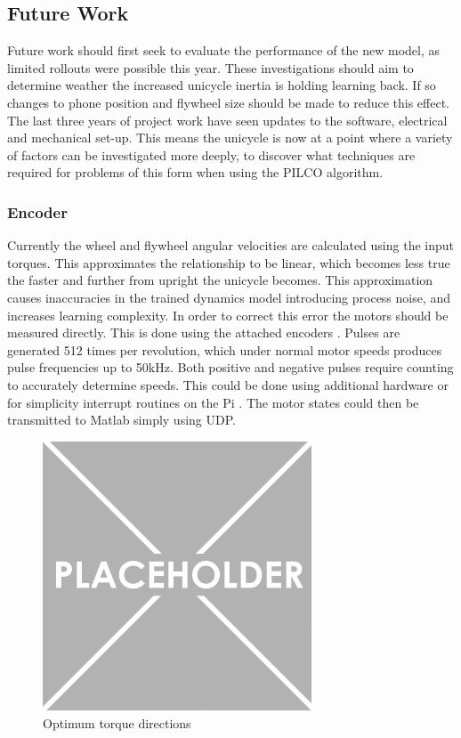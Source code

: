 \documentclass[twoside,twocolumn,12pt]{article}
\begin{document}
\subsection{Future Work}
Future work should first seek to evaluate the performance of the new model, as limited rollouts were possible this year. These investigations should aim to determine weather the increased unicycle inertia is holding learning back. If so changes to phone position and flywheel size should be made to reduce this effect.
\newline
The last three years of project work have seen updates to the software, electrical and mechanical set-up. This means the unicycle is now at a point where a variety of factors can be investigated more deeply, to discover what techniques are required for problems of this form when using the PILCO algorithm. 
\subsubsection{Encoder}
Currently the wheel and flywheel angular velocities are calculated using the input torques. This approximates the relationship to be linear, which becomes less true the faster and further from upright the unicycle becomes. This approximation causes inaccuracies in the trained dynamics model introducing process noise, and increases learning complexity. 
\newline
In order to correct this error the motors should be measured directly. This is done using the attached encoders \cite{encoder}. Pulses are generated 512 times per revolution, which under normal motor speeds produces pulse frequencies up to 50kHz.
\newline
Both positive and negative pulses require counting to accurately determine speeds. This could be done using additional hardware or for simplicity interrupt routines on the Pi \cite{interrupt}. The motor states could then be transmitted to Matlab simply using UDP.
\begin{figure}
  \centering
    \includegraphics[width=\linewidth,height = 8cm]{place}
  \caption{Optimum torque directions}
  \label{fig:quad}
\end{figure} 
\end{document}
